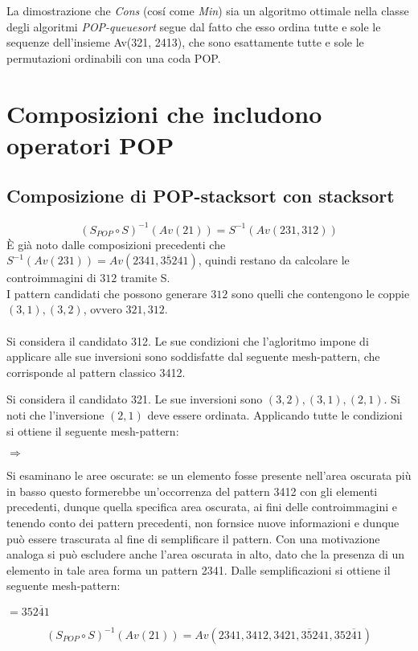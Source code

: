 La dimostrazione che \textit{Cons} (cos\'i come \textit{Min}) sia un algoritmo ottimale nella classe degli algoritmi \textit{POP-queuesort} segue dal fatto che esso ordina tutte e sole le sequenze dell'insieme Av(321, 2413), che sono esattamente tutte e sole le permutazioni ordinabili con una coda POP\cite{cioni2021sorting}.
\section{Composizioni che includono operatori POP}
\subsection{Composizione di {POP-stacksort} con {stacksort}}
$$(S_{POP}\circ{S})^{-1}(Av(21))=S^{-1}(Av(231,312))$$
\`E gi\`a noto dalle composizioni precedenti che $S^{-1}(Av(231))=Av(2341, 3\overline{5}241)$, quindi restano da calcolare le controimmagini di $312$ tramite S.\\
I pattern candidati che possono generare $312$ sono quelli che contengono le coppie $(3,1),(3,2)$, ovvero $321, 312$.\\\\
Si considera il candidato 312. Le sue condizioni che l'agloritmo impone di applicare alle sue inversioni sono soddisfatte dal seguente mesh-pattern, che corrisponde al pattern classico 3412.
\begin{center}
\end{center}
Si considera il candidato 321. Le sue inversioni sono $(3,2),(3,1),(2,1)$. Si noti che l'inversione $(2,1)$ deve essere ordinata. Applicando tutte le condizioni si ottiene il seguente mesh-pattern:
\begin{center}
$\Rightarrow$
\end{center}
Si esaminano le aree oscurate: se un elemento fosse presente nell'area oscurata pi\`u in basso questo formerebbe un'occorrenza del pattern 3412 con gli elementi precedenti, dunque quella specifica area oscurata, ai fini delle controimmagini e tenendo conto dei pattern precedenti, non fornsice nuove informazioni e dunque pu\`o essere trascurata al fine di semplificare il pattern. Con una motivazione analoga si pu\`o escludere anche l'area oscurata in alto, dato che la presenza di un elemento in tale area forma un pattern 2341. Dalle semplificazioni si ottiene il seguente mesh-pattern:
\begin{center}
 $= 352\overline{4}1$
\end{center}
$$(S_{POP}\circ S)^{-1}(Av(21))=Av(2341, 3412, 3421, 3\overline{5}241, 352\overline{4}1)$$
